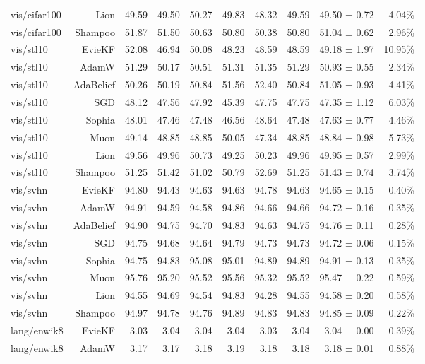 \begin{table}[t]
\begin{tabular}{lrrrrrrrrr}
vis/cifar100 & Lion & 49.59 & 49.50 & 50.27 & 49.83 & 48.32 & 49.59 & 49.50 ± 0.72 & 4.04\% \\
vis/cifar100 & Shampoo & 51.87 & 51.50 & 50.63 & 50.80 & 50.38 & 50.80 & 51.04 ± 0.62 & 2.96\% \\
vis/stl10 & EvieKF & 52.08 & 46.94 & 50.08 & 48.23 & 48.59 & 48.59 & 49.18 ± 1.97 & 10.95\% \\
vis/stl10 & AdamW & 51.29 & 50.17 & 50.51 & 51.31 & 51.35 & 51.29 & 50.93 ± 0.55 & 2.34\% \\
vis/stl10 & AdaBelief & 50.26 & 50.19 & 50.84 & 51.56 & 52.40 & 50.84 & 51.05 ± 0.93 & 4.41\% \\
vis/stl10 & SGD & 48.12 & 47.56 & 47.92 & 45.39 & 47.75 & 47.75 & 47.35 ± 1.12 & 6.03\% \\
vis/stl10 & Sophia & 48.01 & 47.46 & 47.48 & 46.56 & 48.64 & 47.48 & 47.63 ± 0.77 & 4.46\% \\
vis/stl10 & Muon & 49.14 & 48.85 & 48.85 & 50.05 & 47.34 & 48.85 & 48.84 ± 0.98 & 5.73\% \\
vis/stl10 & Lion & 49.56 & 49.96 & 50.73 & 49.25 & 50.23 & 49.96 & 49.95 ± 0.57 & 2.99\% \\
vis/stl10 & Shampoo & 51.25 & 51.42 & 51.02 & 50.79 & 52.69 & 51.25 & 51.43 ± 0.74 & 3.74\% \\
vis/svhn & EvieKF & 94.80 & 94.43 & 94.63 & 94.63 & 94.78 & 94.63 & 94.65 ± 0.15 & 0.40\% \\
vis/svhn & AdamW & 94.91 & 94.59 & 94.58 & 94.86 & 94.66 & 94.66 & 94.72 ± 0.16 & 0.35\% \\
vis/svhn & AdaBelief & 94.90 & 94.75 & 94.70 & 94.83 & 94.63 & 94.75 & 94.76 ± 0.11 & 0.28\% \\
vis/svhn & SGD & 94.75 & 94.68 & 94.64 & 94.79 & 94.73 & 94.73 & 94.72 ± 0.06 & 0.15\% \\
vis/svhn & Sophia & 94.75 & 94.83 & 95.08 & 95.01 & 94.89 & 94.89 & 94.91 ± 0.13 & 0.35\% \\
vis/svhn & Muon & 95.76 & 95.20 & 95.52 & 95.56 & 95.32 & 95.52 & 95.47 ± 0.22 & 0.59\% \\
vis/svhn & Lion & 94.55 & 94.69 & 94.54 & 94.83 & 94.28 & 94.55 & 94.58 ± 0.20 & 0.58\% \\
vis/svhn & Shampoo & 94.97 & 94.78 & 94.76 & 94.89 & 94.83 & 94.83 & 94.85 ± 0.09 & 0.22\% \\
lang/enwik8 & EvieKF & 3.03 & 3.04 & 3.04 & 3.04 & 3.03 & 3.04 & 3.04 ± 0.00 & 0.39\% \\
lang/enwik8 & AdamW & 3.17 & 3.17 & 3.18 & 3.19 & 3.18 & 3.18 & 3.18 ± 0.01 & 0.88\% \\

\end{tabular}
\end{table}
